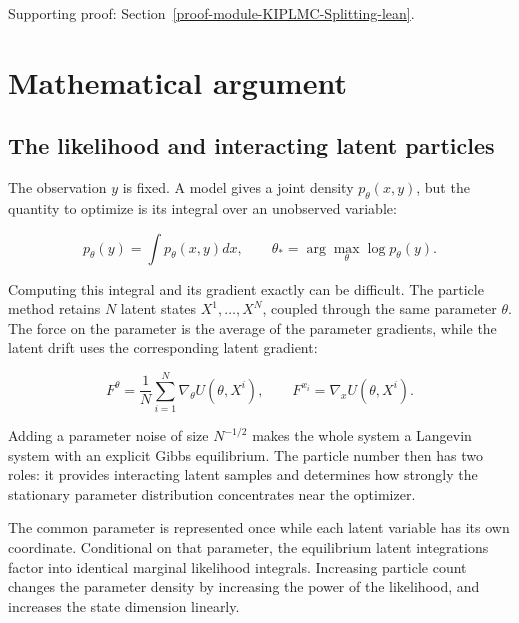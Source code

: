 \documentclass[11pt,a4paper]{report}
\begin{document}
{\small\color{gray}Supporting proof: Section~\ref{proof-module-KIPLMC-Splitting-lean}.\par}
\chapter{Mathematical argument}
\section{\texorpdfstring{The likelihood and interacting latent particles}{The likelihood and interacting latent particles}}


The observation \(y\) is fixed. A model gives a joint density
\(p_\theta(x,y)\), but the quantity to optimize is its integral over an
unobserved variable:


\[p_\theta(y)=\int p_\theta(x,y)dx,
\qquad\theta_*=\arg\max_\theta\log p_\theta(y).\]


Computing this integral and its gradient exactly can be difficult. The
particle method retains \(N\) latent states \(X^1,\ldots,X^N\), coupled
through the same parameter \(\theta\). The force on the parameter is the
average of the parameter gradients, while the latent drift uses the corresponding
latent gradient:


\[F^\theta=\frac1N\sum_{i=1}^N\nabla_\theta U(\theta,X^i),
\qquad F^{x_i}=\nabla_xU(\theta,X^i).\]


Adding a parameter noise of size \(N^{-1/2}\) makes the whole system a
Langevin system with an explicit Gibbs equilibrium. The particle number then
has two roles: it provides interacting latent samples and determines how
strongly the stationary parameter distribution concentrates near the optimizer.



The common parameter is represented once while each latent variable has its own coordinate. Conditional on that parameter, the equilibrium latent integrations factor into identical marginal likelihood integrals. Increasing particle count changes the parameter density by increasing the power of the likelihood, and increases the state dimension linearly.
\end{document}
